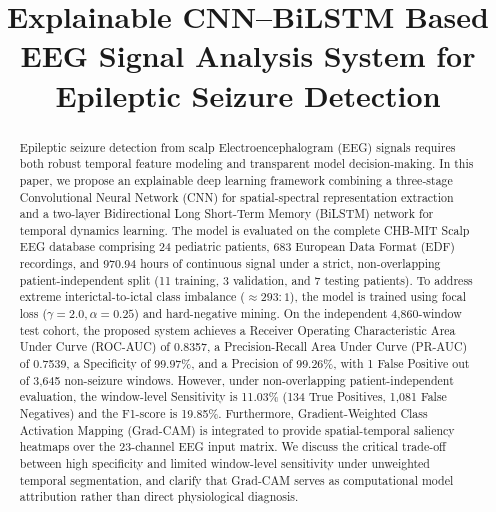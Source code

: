 \documentclass[conference]{IEEEtran}
\begin{document}
\title{Explainable CNN--BiLSTM Based EEG Signal Analysis System for Epileptic Seizure Detection}

\author{
}

\maketitle

\begin{abstract}
Epileptic seizure detection from scalp Electroencephalogram (EEG) signals requires both robust temporal feature modeling and transparent model decision-making. In this paper, we propose an explainable deep learning framework combining a three-stage Convolutional Neural Network (CNN) for spatial-spectral representation extraction and a two-layer Bidirectional Long Short-Term Memory (BiLSTM) network for temporal dynamics learning. The model is evaluated on the complete CHB-MIT Scalp EEG database comprising 24 pediatric patients, 683 European Data Format (EDF) recordings, and 970.94 hours of continuous signal under a strict, non-overlapping patient-independent split (11 training, 3 validation, and 7 testing patients). To address extreme interictal-to-ictal class imbalance ($\approx 293:1$), the model is trained using focal loss ($\gamma=2.0, \alpha=0.25$) and hard-negative mining. On the independent 4,860-window test cohort, the proposed system achieves a Receiver Operating Characteristic Area Under Curve (ROC-AUC) of 0.8357, a Precision-Recall Area Under Curve (PR-AUC) of 0.7539, a Specificity of 99.97\%, and a Precision of 99.26\%, with 1 False Positive out of 3,645 non-seizure windows. However, under non-overlapping patient-independent evaluation, the window-level Sensitivity is 11.03\% (134 True Positives, 1,081 False Negatives) and the F1-score is 19.85\%. Furthermore, Gradient-Weighted Class Activation Mapping (Grad-CAM) is integrated to provide spatial-temporal saliency heatmaps over the 23-channel EEG input matrix. We discuss the critical trade-off between high specificity and limited window-level sensitivity under unweighted temporal segmentation, and clarify that Grad-CAM serves as computational model attribution rather than direct physiological diagnosis.
\end{abstract}
\end{document}
